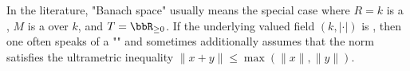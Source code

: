 \begin{definition}
    In the literature, "Banach space" usually means the special case where $R = k$ is a , $M$ is a  over $k$, and $T = \bbR_{\geq 0}$. If the underlying valued field $(k, |\cdot|)$ is , then one often speaks of a "" and sometimes additionally assumes that the norm satisfies the ultrametric inequality $\|x + y\| \leq \max(\|x\|, \|y\|)$.
\end{definition}